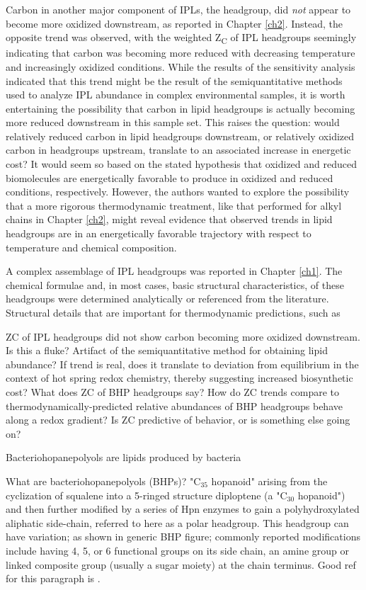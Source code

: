 Carbon in another major component of IPLs, the headgroup, did \textit{not} appear to become more oxidized downstream, as reported in Chapter \ref{ch2}. Instead, the opposite trend was observed, with the weighted Z\textsubscript{C} of IPL headgroups seemingly indicating that carbon was becoming more reduced with decreasing temperature and increasingly oxidized conditions. While the results of the sensitivity analysis indicated that this trend might be the result of the semiquantitative methods used to analyze IPL abundance in complex environmental samples, it is worth entertaining the possibility that carbon in lipid headgroups is actually becoming more reduced downstream in this sample set. This raises the question: would relatively reduced carbon in lipid headgroups downstream, or relatively oxidized carbon in headgroups upstream, translate to an associated increase in energetic cost? It would seem so based on the stated hypothesis that oxidized and reduced biomolecules are energetically favorable to produce in oxidized and reduced conditions, respectively. However, the authors wanted to explore the possibility that a more rigorous thermodynamic treatment, like that performed for alkyl chains in Chapter \ref{ch2}, might reveal evidence that observed trends in lipid headgroups are in an energetically favorable trajectory with respect to temperature and chemical composition.

A complex assemblage of IPL headgroups was reported in Chapter \ref{ch1}. The chemical formulae and, in most cases, basic structural characteristics, of these headgroups were determined analytically or referenced from the literature. Structural details that are important for thermodynamic predictions, such as 




ZC of IPL headgroups did not show carbon becoming more oxidized downstream. Is this a fluke? Artifact of the semiquantitative method for obtaining lipid abundance? If trend is real, does it translate to deviation from equilibrium in the context of hot spring redox chemistry, thereby suggesting increased biosynthetic cost? What does ZC of BHP headgroups say? How do ZC trends compare to thermodynamically-predicted relative abundances of BHP headgroups behave along a redox gradient? Is ZC predictive of behavior, or is something else going on?


Bacteriohopanepolyols are lipids produced by bacteria

What are bacteriohopanepolyols (BHPs)? "C$_{35}$ hopanoid" arising from the cyclization of squalene into a 5-ringed structure diploptene (a "C$_{30}$ hopanoid") and then further modified by a series of Hpn enzymes to gain a polyhydroxylated aliphatic side-chain, referred to here as a polar headgroup. This headgroup can have variation; as shown in generic BHP figure; commonly reported modifications include having 4, 5, or 6 functional groups on its side chain, an amine group or linked composite group (usually a sugar moiety) at the chain terminus. Good ref for this paragraph is \citep{belin2018hopanoid}.

